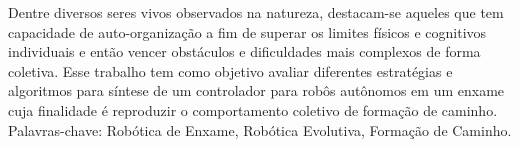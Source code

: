 Dentre diversos seres vivos observados na natureza, destacam-se aqueles que tem capacidade de auto-organização a fim de superar os limites físicos e cognitivos individuais e então vencer obstáculos e dificuldades mais complexos de forma coletiva. Esse trabalho tem como objetivo avaliar diferentes estratégias e algoritmos para síntese de um controlador para robôs autônomos em um enxame cuja finalidade é reproduzir o comportamento coletivo de formação de caminho.\\

\noindent
Palavras-chave: Robótica de Enxame, Robótica Evolutiva, Formação de Caminho.
